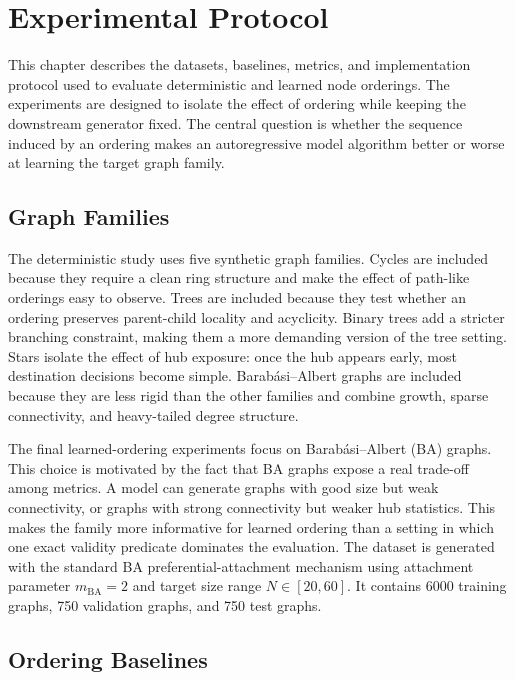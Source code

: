 \chapter{Experimental Protocol}
\label{chap:experimental-protocol}

This chapter describes the datasets, baselines, metrics, and implementation protocol used to evaluate deterministic and learned node orderings. The experiments are designed to isolate the effect of ordering while keeping the downstream generator fixed. The central question is whether the sequence induced by an ordering makes an autoregressive model algorithm better or worse at learning the target graph family.

\section{Graph Families}
\label{sec:protocol-graph-families}

The deterministic study uses five synthetic graph families. Cycles are included because they require a clean ring structure and make the effect of path-like orderings easy to observe. Trees are included because they test whether an ordering preserves parent-child locality and acyclicity. Binary trees add a stricter branching constraint, making them a more demanding version of the tree setting. Stars isolate the effect of hub exposure: once the hub appears early, most destination decisions become simple. Barab\'asi--Albert graphs are included because they are less rigid than the other families and combine growth, sparse connectivity, and heavy-tailed degree structure.

The final learned-ordering experiments focus on Barab\'asi--Albert (BA) graphs. This choice is motivated by the fact that BA graphs expose a real trade-off among metrics. A model can generate graphs with good size but weak connectivity, or graphs with strong connectivity but weaker hub statistics. This makes the family more informative for learned ordering than a setting in which one exact validity predicate dominates the evaluation. The dataset is generated with the standard BA preferential-attachment mechanism using attachment parameter $m_{\mathrm{BA}}=2$ and target size range $N\in[20,60]$. It contains 6000 training graphs, 750 validation graphs, and 750 test graphs.

\section{Ordering Baselines}
\label{sec:protocol-baselines}

